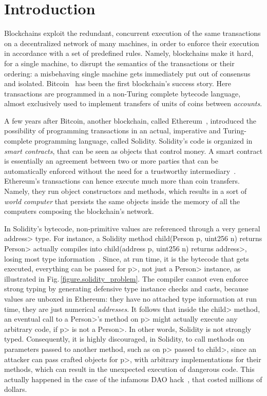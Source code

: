\section{Introduction}\label{sec:introduction}

Blockchains exploit the redundant, concurrent execution of the same
transactions on a decentralized network of many machines,
in order to enforce their execution in accordance with
a set of predefined rules. Namely, blockchains make it hard, for a single machine,
to disrupt the semantics of the transactions or their ordering: a misbehaving single machine
gets immediately put out of consensus and isolated. Bitcoin~\cite{Nakamoto08,book-mastering-bitcoin}
has been the first blockchain's success story. Here
transactions are programmed in a non-Turing complete bytecode language,
almost exclusively used to implement transfers of units of coins between \emph{accounts}.

A few years after Bitcoin, another blockchain, called
Ethereum~\cite{Buterin13,AntonopoulosW18}, introduced the possibility of programming
transactions in an actual, imperative and Turing-complete programming language, called Solidity.
Solidity's code is organized in \emph{smart contracts}, that can be seen as
objects that control money. A smart contract is essentially an agreement between two or more parties that can be automatically enforced without the need for a trustworthy intermediary~\cite{ebp}.
Ethereum's transactions can hence execute much more than coin transfers. Namely,
they run object constructors and methods, which results in a sort
of \emph{world computer} that persists the same objects inside the memory of all the
computers composing the blockchain's network.

In Solidity's bytecode,
non-primitive values are referenced through a very general
\<address> type. For instance, a Solidity method
\<child(Person p, uint256 n) returns Person> actually compiles
into \<child(address p, uint256 n) returns address>, losing most
type information~\cite{CrafaPZ19}.
Since, at run time, it is the bytecode that gets executed,
everything can be passed for \<p>, not just a \<Person> instance, as illustrated in Fig.\,\ref{figure.solidity_problem}.
The compiler cannot even enforce strong typing
by generating defensive type instance checks and casts, because
values are unboxed in Ethereum: they have no attached
type information at run time,
they are just numerical \emph{addresses}.
It follows that inside the \<child> method, an eventual call to a \<Person>'s method
on \<p> might actually execute any arbitrary code, if \<p> is not a \<Person>.
In other words, Solidity is not strongly typed.
Consequently, it is highly discouraged, in Solidity, to call methods on parameters passed
to another method, such as on \<p> passed to \<child>, since an attacker can pass crafted
objects for \<p>, with arbitrary implementations for their methods,
which can result in the unexpected execution of
dangerous code. This actually happened in the case of the infamous DAO hack~\cite{dao16}, that
costed millions of dollars.

